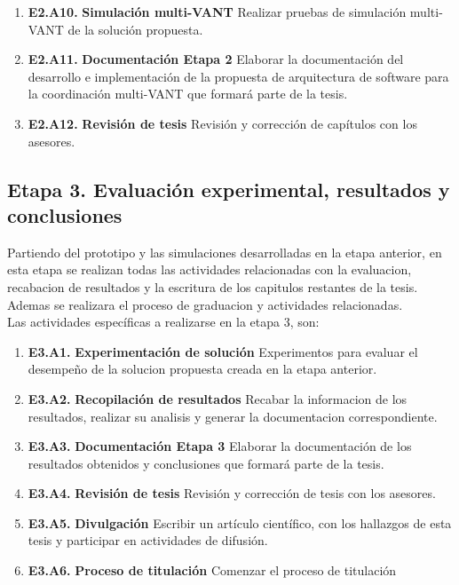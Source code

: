 \documentclass[11pt,epsf,times]{article}
\begin{document}
\begin{enumerate}
  \item[] \textbf{E2.A10.} \textbf{Simulaci\'{o}n multi-VANT} Realizar pruebas de simulaci\'{o}n multi-VANT de la soluci\'{o}n propuesta.
  \item[] \textbf{E2.A11.} \textbf{Documentaci\'{o}n Etapa 2} Elaborar la documentaci\'{o}n del desarrollo e implementaci\'{o}n de la propuesta de arquitectura de software para la coordinaci\'{o}n multi-VANT que formar\'{a} parte de la tesis.
  \item[] \textbf{E2.A12.} \textbf{Revisi\'{o}n de tesis} Revisi\'{o}n y correcci\'{o}n de cap\'{i}tulos con los asesores.
  \end{enumerate}
  

  \subsection*{Etapa 3. Evaluaci\'{o}n experimental, resultados y conclusiones}
  
  Partiendo del prototipo y las simulaciones desarrolladas en la etapa anterior, en esta etapa se realizan todas las actividades relacionadas con la evaluacion, recabacion de resultados y la escritura de los capitulos restantes de la tesis. Ademas se realizara el proceso de graduacion y actividades relacionadas.\\

  Las actividades espec\'{i}ficas a realizarse en la etapa 3, son:
  
  \begin{enumerate}
  \item[] \textbf{E3.A1.} \textbf{Experimentaci\'{o}n de soluci\'{o}n} Experimentos para evaluar el desempe\~{n}o de la solucion propuesta creada en la etapa anterior.  
  \item[] \textbf{E3.A2.} \textbf{Recopilaci\'{o}n de resultados} Recabar la informacion de los resultados, realizar su analisis y generar la documentacion correspondiente.
  \item[] \textbf{E3.A3.} \textbf{Documentaci\'{o}n Etapa 3} Elaborar la documentaci\'{o}n de los resultados obtenidos y conclusiones que formar\'{a} parte de la tesis.
  \item[] \textbf{E3.A4.} \textbf{Revisi\'{o}n de tesis} Revisi\'{o}n y correcci\'{o}n de tesis con los asesores.
  \item[] \textbf{E3.A5.} \textbf{Divulgaci\'{o}n} Escribir un art\'{i}culo cient\'{i}fico, con los hallazgos de esta tesis y participar en actividades de difusi\'{o}n.
  \item[] \textbf{E3.A6.} \textbf{Proceso de titulaci\'{o}n} Comenzar el proceso de titulaci\'{o}n
  \end{enumerate}
  
\end{document}

